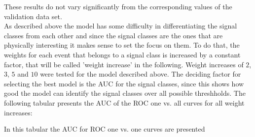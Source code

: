 These results do not vary significantly from the corresponding values of the validation data set. \\

As described above the model has some difficulty in differentiating the signal classes from each other and since the signal classes are the ones that are physically interesting it makes
sense to set the focus on them. To do that, the weights for each event that belongs to a signal class is increased by a constant factor, that will be called 'weight increase' in the following. 
Weight increases of $2$, $3$, $5$ and $10$ were tested for the model described above. The deciding factor for selecting the best model is the AUC for the signal classes, since this shows
how good the model can identify the signal classes over all possible threshholds. The following tabular presents the AUC of the ROC one vs. all curves for all weight increases:


In this tabular the AUC for ROC one vs. one curves are presented



